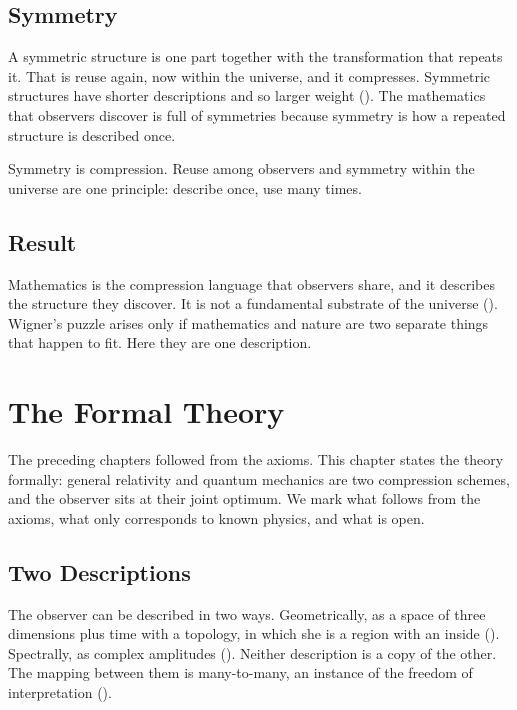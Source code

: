 \documentclass[11pt]{book}
\begin{document}
\section{Symmetry}
\label{sec:symmetry}

A symmetric structure is one part together with the transformation that
repeats it. That is reuse again, now within the universe, and it
compresses. Symmetric structures have shorter descriptions and so larger
weight (). The mathematics that observers discover is full
of symmetries because symmetry is how a repeated structure is described
once.

\begin{deduction}[Symmetry]\label{ded:symmetry}
  Symmetry is compression. Reuse among observers and symmetry within the
  universe are one principle: describe once, use many times.
\end{deduction}


\section{Result}

Mathematics is the compression language that observers share, and it
describes the structure they discover. It is not a fundamental substrate of
the universe (). Wigner's puzzle arises only if
mathematics and nature are two separate things that happen to fit. Here
they are one description.



\chapter{The Formal Theory}
\label{ch:formal}

The preceding chapters followed from the axioms. This chapter states the
theory formally: general relativity and quantum mechanics are two
compression schemes, and the observer sits at their joint optimum. We mark
what follows from the axioms, what only corresponds to known physics, and
what is open.


\section{Two Descriptions}
\label{sec:two}

The observer can be described in two ways. Geometrically, as a space of
three dimensions plus time with a topology, in which she is a region with an
inside (). Spectrally, as complex amplitudes
(). Neither description is a copy of the other. The mapping
between them is many-to-many, an instance of the freedom of
interpretation ().
\end{document}
